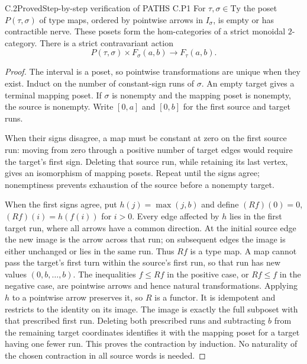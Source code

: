 \begin{claim}{C.2}{Proved}{Step-by-step verification of PATHS C.P1}
For $\tau,\sigma\in\mathrm{Ty}$ the poset
$P(\tau,\sigma)$ of type maps, ordered by pointwise arrows in
$I_\sigma$, is empty or has contractible nerve. These posets form the
hom-categories of a strict monoidal $2$-category. There is a strict
contravariant action
\[
 P(\tau,\sigma)\times F_\sigma(a,b)\longrightarrow F_\tau(a,b).
\]
\end{claim}
\begin{proof}
The interval is a poset, so pointwise transformations are unique when
they exist. Induct on the number of constant-sign runs of $\sigma$.
An empty target gives a terminal mapping poset. If $\sigma$ is nonempty
and the mapping poset is nonempty, the source is nonempty. Write
$[0,a]$ and $[0,b]$ for the first source and target runs.

When their signs disagree, a map must be constant at zero on the first
source run: moving from zero through a positive number of target
edges would require the target's first sign. Deleting that source run,
while retaining its last vertex, gives an isomorphism of mapping
posets. Repeat until the signs agree; nonemptiness prevents exhaustion
of the source before a nonempty target.

When the first signs agree, put $h(j)=\max(j,b)$ and define
$(Rf)(0)=0$, $(Rf)(i)=h(f(i))$ for $i>0$. Every edge affected by $h$
lies in the first target run, where all arrows have a common direction.
At the initial source edge the new image is the arrow across that run;
on subsequent edges the image is either unchanged or lies in the same
run. Thus $Rf$ is a type map. A map cannot pass the target's first
turn within the source's first run, so that run has new values
$(0,b,\ldots,b)$. The inequalities $f\leq Rf$ in the positive case,
or $Rf\leq f$ in the negative case, are pointwise arrows and hence
natural transformations. Applying $h$ to a pointwise arrow preserves
it, so $R$ is a functor. It is idempotent and restricts to the identity
on its image. The image is exactly the full subposet with that
prescribed first run. Deleting both prescribed runs and subtracting
$b$ from the remaining target coordinates identifies it with the
mapping poset for a target having one fewer run. This proves the
contraction by induction. No naturality of the chosen contraction in
all source words is needed.


\end{proof}
